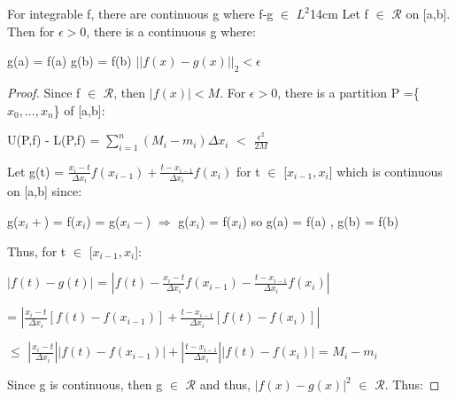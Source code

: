     \begin{wtheorem}
    {For integrable f, there are continuous g where f-g $\in$ $L^2$}{14cm}
        Let f $\in$ $\mathscr{R}$ on [a,b]. Then for $\epsilon > 0$, there is a
        continuous g where:
        
        \hspace{0.5cm}
        g(a) = f(a)
        \hspace{1cm}
        g(b) = f(b)
        \hspace{1cm}
        $||f(x)-g(x)||_2 < \epsilon$
    \end{wtheorem}

    \begin{proof}
        Since f $\in$ $\mathscr{R}$, then $|f(x)| < M$. For $\epsilon> 0$,
        there is a partition P =\{$x_0,...,x_n$\} of [a,b]:

        \hspace{0.5cm}
        U(P,f) - L(P,f)
        = $\sum_{i=1}^n (M_i - m_i)\Delta x_i$
        $<$ $\frac{\epsilon^2}{2M}$

        Let g(t) = $\frac{x_i-t}{\Delta x_i} f(x_{i-1})
                    + \frac{t-x_{i-1}}{\Delta x_i} f(x_i)$
        for t $\in$ [$x_{i-1},x_i$] which is continuous on [a,b] since:

        \hspace{0.5cm}
        g($x_i+$) = f($x_i$) = g($x_i-$)
        \hspace{1cm}
        $\Rightarrow$
        \hspace{1cm}
        g($x_i$) = f($x_i$)
        so g(a) = f(a) , g(b) = f(b)

        Thus, for t $\in$ [$x_{i-1},x_i$]:

        \hspace{0.5cm}
        $|f(t) - g(t)|$
        = $|f(t) - \frac{x_i-t}{\Delta x_i} f(x_{i-1})
            - \frac{t-x_{i-1}}{\Delta x_i} f(x_i)|$

        \hspace{0.5cm}
        = $|\frac{x_i-t}{\Delta x_i} [f(t) - f(x_{i-1})]
            + \frac{t-x_{i-1}}{\Delta x_i} [f(t) - f(x_i)]|$

        \hspace{0.5cm}
        $\leq$ $|\frac{x_i-t}{\Delta x_i}| |f(t) - f(x_{i-1})|
                + |\frac{t-x_{i-1}}{\Delta x_i}| |f(t) - f(x_i)|$
        = $M_i - m_i$

        Since g is continuous, then g $\in$ $\mathscr{R}$ and thus, $|f(x)-g(x)|^2$
        $\in$ $\mathscr{R}$. Thus:


\end{proof}
